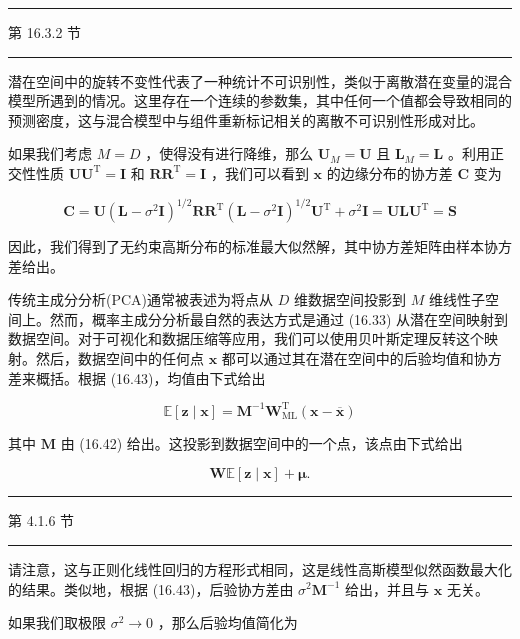 \documentclass[10pt]{report}
\newcommand{\HRule}{\begin{center}\rule{0.9\linewidth}{0.2mm}\end{center}}
\begin{document}
\HRule

第 16.3.2 节

\HRule

潜在空间中的旋转不变性代表了一种统计不可识别性，类似于离散潜在变量的混合模型所遇到的情况。这里存在一个连续的参数集，其中任何一个值都会导致相同的预测密度，这与混合模型中与组件重新标记相关的离散不可识别性形成对比。

如果我们考虑 \(M = D\) ，使得没有进行降维，那么 \({\mathbf{U}}_{M} = \mathbf{U}\) 且 \({\mathbf{L}}_{M} = \mathbf{L}\) 。利用正交性性质 \(\mathbf{U}{\mathbf{U}}^{\mathrm{T}} = \mathbf{I}\) 和 \({\mathbf{{RR}}}^{\mathrm{T}} = \mathbf{I}\) ，我们可以看到 \(\mathbf{x}\) 的边缘分布的协方差 \(\mathbf{C}\) 变为

\[
\mathbf{C} = \mathbf{U}{\left( \mathbf{L} - {\sigma }^{2}\mathbf{I}\right) }^{1/2}\mathbf{R}{\mathbf{R}}^{\mathrm{T}}{\left( \mathbf{L} - {\sigma }^{2}\mathbf{I}\right) }^{1/2}{\mathbf{U}}^{\mathrm{T}} + {\sigma }^{2}\mathbf{I} = \mathbf{U}\mathbf{L}{\mathbf{U}}^{\mathrm{T}} = \mathbf{S} \tag{16.48}
\]

因此，我们得到了无约束高斯分布的标准最大似然解，其中协方差矩阵由样本协方差给出。

传统主成分分析(PCA)通常被表述为将点从 \(D\) 维数据空间投影到 \(M\) 维线性子空间上。然而，概率主成分分析最自然的表达方式是通过 (16.33) 从潜在空间映射到数据空间。对于可视化和数据压缩等应用，我们可以使用贝叶斯定理反转这个映射。然后，数据空间中的任何点 \(\mathbf{x}\) 都可以通过其在潜在空间中的后验均值和协方差来概括。根据 (16.43)，均值由下式给出

\[
\mathbb{E}\left\lbrack  {\mathbf{z} \mid  \mathbf{x}}\right\rbrack   = {\mathbf{M}}^{-1}{\mathbf{W}}_{\mathrm{{ML}}}^{\mathrm{T}}\left( {\mathbf{x} - \overline{\mathbf{x}}}\right)  \tag{16.49}
\]

其中 \(\mathbf{M}\) 由 (16.42) 给出。这投影到数据空间中的一个点，该点由下式给出

\[
\mathbf{W}\mathbb{E}\left\lbrack  {\mathbf{z} \mid  \mathbf{x}}\right\rbrack   + \mathbf{\mu }. \tag{16.50}
\]

\HRule

第 4.1.6 节

\HRule

请注意，这与正则化线性回归的方程形式相同，这是线性高斯模型似然函数最大化的结果。类似地，根据 (16.43)，后验协方差由 \({\sigma }^{2}{\mathbf{M}}^{-1}\) 给出，并且与 \(\mathbf{x}\) 无关。

如果我们取极限 \({\sigma }^{2} \rightarrow  0\) ，那么后验均值简化为
\end{document}
